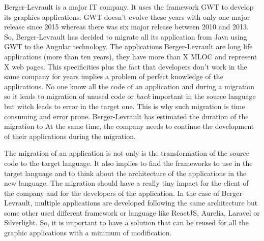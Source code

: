 \documentclass[conference]{IEEEtran}
\begin{document}
Berger-Levrault is a major IT company.
It uses the framework GWT to develop its graphics applications.
GWT doesn't evolve these years with only one major release since 2015 whereas there was six major release between 2010 and 2013.
So, Berger-Levrault has decided to migrate all its application from Java using GWT to the Angular technology.
The applications Berger-Levrault are long life applications (more than ten years),
    they have more than X MLOC and represent
    X web pages. 
This specificities plus the fact that developers don't work in the same company for years implies
    a problem of perfect knowledge of the applications.
No one know all the code of an application and during a migration so
    it leads to migration of unused code or \emph{hack} important in the source language but witch leads to error in the target one.
This is why such migration is time consuming and error prone.
Berger-Levrault has estimated the duration of the migration to
At the same time, the company needs to continue the development of their applications during the migration.


The migration of an application is not only is the transformation of the source code to the target language. 
It also implies to find the frameworks to use in the target language 
    and to think about the architecture of the applications in the new language.
The migration should have a really tiny impact for the client of the company and for the developers of the application.
In the case of Berger-Levrault, multiple applications are developed following the same architecture
    but some other used different framework or language like ReactJS, Aurelia, Laravel or Silverlight.
So, it is important to have a solution that can be reused for all the graphic applications with a minimum of modification.

\end{document}
